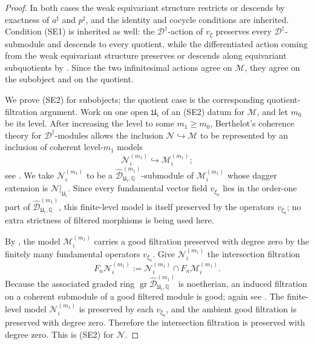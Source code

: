 \documentclass[11pt]{amsart}
\theoremstyle{plain}
\theoremstyle{definition}
\theoremstyle{remark}
\newcommand{\gr}{\operatorname{gr}}
\begin{document}
\begin{proof}
In both cases the weak equivariant structure restricts or descends by exactness
of \(a^\sharp\) and \(p^\sharp\), and the identity and cocycle conditions are
inherited. Condition \textup{(SE1)} is inherited as well: the
\(\mathscr D^\dagger\)-action of \(v_\xi\) preserves every
\(\mathscr D^\dagger\)-submodule and descends to every quotient, while the
differentiated action coming from the weak equivariant structure preserves or
descends along equivariant subquotients by
. Since the two infinitesimal
actions agree on \(\mathcal M\), they agree on the subobject and on the
quotient.

We prove \textup{(SE2)} for subobjects; the quotient case is the corresponding
quotient-filtration argument. Work on one open \(\mathfrak U_i\) of an
\textup{(SE2)} datum for \(\mathcal M\), and let \(m_0\) be its level. After
increasing the level to some \(m_1\ge m_0\), Berthelot's coherence theory for
\(\mathscr D^\dagger\)-modules allows the inclusion
\(\mathcal N\hookrightarrow\mathcal M\) to be represented by an inclusion of
coherent level-\(m_1\) models
\[
  \mathcal N_i^{(m_1)}\hookrightarrow \mathcal M_i^{(m_1)};
\]
see \cite[5.3.2--5.3.4]{BerthelotIntro}.  We take
\(\mathcal N_i^{(m_1)}\) to be a
\(\widehat{\mathscr D}^{(m_1)}_{\mathfrak U_i,\mathbb Q}\)-submodule of
\(\mathcal M_i^{(m_1)}\) whose dagger extension is
\(\mathcal N|_{\mathfrak U_i}\).  Since every fundamental vector field
\(v_{\xi_a}\) lies in the order-one part of
\(\widehat{\mathscr D}^{(m_1)}_{\mathfrak U_i,\mathbb Q}\), this finite-level
model is itself preserved by the operators \(v_{\xi_a}\); no extra strictness of
filtered morphisms is being used here.

By , the model \(\mathcal M_i^{(m_1)}\) carries a
good filtration preserved with degree zero by the finitely many fundamental
operators \(v_{\xi_a}\). Give \(\mathcal N_i^{(m_1)}\) the intersection
filtration
\[
  F_n\mathcal N_i^{(m_1)}
  :=
  \mathcal N_i^{(m_1)}\cap F_n\mathcal M_i^{(m_1)}.
\]
Because the associated graded ring
\(\gr\widehat{\mathscr D}^{(m_1)}_{\mathfrak U_i,\mathbb Q}\) is noetherian, an
induced filtration on a coherent submodule of a good filtered module is good;
again see \cite[5.3.2--5.3.4]{BerthelotIntro}.  The finite-level model
\(\mathcal N_i^{(m_1)}\) is preserved by each \(v_{\xi_a}\), and the ambient
good filtration is preserved with degree zero. Therefore the intersection
filtration is preserved with degree zero. This is \textup{(SE2)} for
\(\mathcal N\).


\end{proof}
\end{document}
